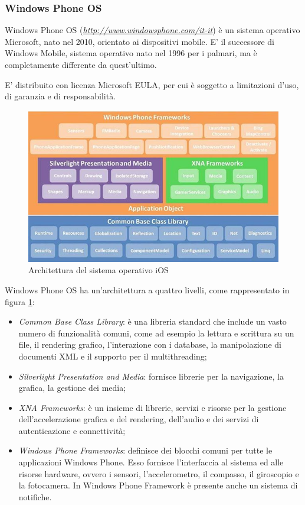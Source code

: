 \subsubsection{Windows Phone OS}
Windows Phone OS (\emph{\url{http://www.windowsphone.com/it-it}}) è un sistema operativo Microsoft, nato nel 2010, orientato ai dispositivi mobile. E' il successore di Windows Mobile, sistema operativo nato nel 1996 per i palmari, ma è completamente differente da quest'ultimo.

E' distribuito con licenza Microsoft EULA, per cui è soggetto a limitazioni d'uso, di garanzia e di responsabilità.

\begin{figure}
\begin{center}
\includegraphics[scale=0.7]{imgs/windowsphone_architecture.jpg} 
\caption{Architettura del sistema operativo iOS\label{wparchitecture}}
\end{center}
\end{figure}

Windows Phone OS ha un'architettura a quattro livelli, come rappresentato in figura \ref{wparchitecture}:
\begin{itemize}
\item \emph{Common Base Class Library}: è una libreria standard che include un vasto numero di funzionalità comuni, come ad esempio la lettura e scrittura su un file, il rendering grafico, l'interazione con i database, la manipolazione di documenti XML e il supporto per il multithreading;
\item \emph{Silverlight Presentation and Media}: fornisce librerie per la navigazione, la grafica, la gestione dei media;
\item \emph{XNA Frameworks}: è un insieme di librerie, servizi e risorse per la gestione dell'accelerazione grafica e del rendering, dell'audio e dei servizi di autenticazione e connettività;
\item \emph{Windows Phone Frameworks}: definisce dei blocchi comuni per tutte le applicazioni Windows Phone. Esso fornisce l'interfaccia al sistema ed alle risorse hardware, ovvero i sensori, l'accelerometro, il compasso, il giroscopio e la fotocamera. In Windows Phone Framework è presente anche un sistema di notifiche.
\end{itemize}

